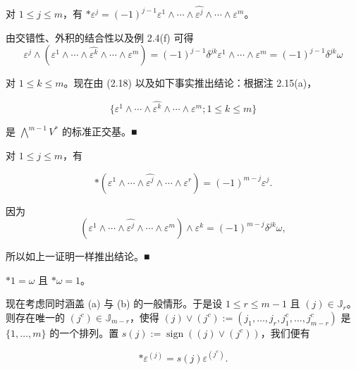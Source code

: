 \begin{example}

\begin{items}
\item

对 $ 1 \le j \le m $，有 $ \ast\varepsilon^{j} = (-1)^{j-1}\varepsilon^{1} \wedge \cdots \wedge \widehat{\varepsilon^{j}} \wedge \cdots \wedge \varepsilon^{m} $。

\proofhead
由交错性、外积的结合性以及例 2.4(f) 可得
\[
\varepsilon^{j} \wedge (\varepsilon^{1} \wedge \cdots \wedge \widehat{\varepsilon^{k}} \wedge \cdots \wedge \varepsilon^{m}) = (-1)^{j-1}\delta^{jk}\varepsilon^{1} \wedge \cdots \wedge \varepsilon^{m} = (-1)^{j-1}\delta^{jk}\omega
\]

对 $ 1 \le k \le m $。现在由 (2.18) 以及如下事实推出结论：根据注 2.15(a)，

\[
\{\varepsilon^{1} \wedge \cdots \wedge \widehat{\varepsilon^{k}} \wedge \cdots \wedge \varepsilon^{m}; 1 \le k \le m\}
\]

是 $ \bigwedge^{m-1}V^{*} $ 的标准正交基。\nobreak\hspace{0.35em}■

\item

对 $ 1 \le j \le m $，有

\[
\ast(\varepsilon^{1} \wedge \cdots \wedge \widehat{\varepsilon^{j}} \wedge \cdots \wedge \varepsilon^{r}) = (-1)^{m-j}\varepsilon^{j}.
\]

\proofhead
因为
\[
(\varepsilon^{1} \wedge \cdots \wedge \widehat{\varepsilon^{j}} \wedge \cdots \wedge \varepsilon^{m}) \wedge \varepsilon^{k} = (-1)^{m-j}\delta^{jk}\omega,
\]

所以如上一证明一样推出结论。\nobreak\hspace{0.35em}■

\item

$ \ast 1 = \omega $ 且 $ \ast\omega = 1 $。

\item

现在考虑同时涵盖 (a) 与 (b) 的一般情形。于是设 $ 1 \le r \le m-1 $ 且 $ (j) \in \mathbb{J}_r $。则存在唯一的 $ (j^{c}) \in \mathbb{J}_{m-r} $，使得 $ (j) \vee (j^{c}) := (j_1,\ldots,j_r,j_1^{c},\ldots,j_{m-r}^{c}) $ 是 $ \{1,\ldots,m\} $ 的一个排列。置 $ s(j) := \operatorname{sign}((j) \vee (j^{c})) $，我们便有

\begin{equation}
\ast\varepsilon^{(j)} = s(j)\varepsilon^{(j^{c})}.\tag{2.20}
\end{equation}


\end{items}
\end{example}
